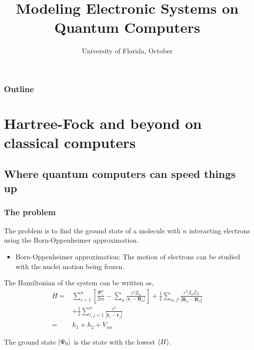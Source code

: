 \documentclass{beamer}
\title{Modeling Electronic Systems on Quantum Computers}
\date{University of Florida, October}
\renewcommand{\(}{\left(}
\renewcommand{\)}{\right)}
\renewcommand{\[}{\left[}
\renewcommand{\]}{\right]}
\begin{document}
\frame{\titlepage} 

\begin{frame}
    \frametitle{Outline}

    \tableofcontents

\end{frame}

\section{Hartree-Fock and beyond on classical computers}
\subsection{Where quantum computers can speed things up}

\begin{frame}
    \frametitle{The problem}

    The problem is to find the ground state of a molecule with $n$ interacting electrons using the Born-Oppenheimer approximation.
    \begin{itemize}
        \item Born-Oppenheimer approximation: The motion of electrons can be studied with the nuclei motion being frozen.
    \end{itemize}
    \pause
    The Hamiltonian of the system can be written as,
    \begin{align*}
        H = &\sum_{i=1}^n \[\frac{\bm P^2_i}{2m} - \sum_\alpha \frac{e^2 Z_\alpha}{|\bm r_i - \bm R_\alpha|} \] + \frac{1}{2} \sum_{\alpha, \beta} \frac{e^2 Z_\alpha Z_\beta}{|\bm R_\alpha - \bm R_\beta|} \\ 
        &+ \frac{1}{2} \sum_{i,j = 1}^n \frac{e^2}{|\bm r_i - \bm r_j|} \\ 
        =& h_1 + h_2 + V_{nn}
    \end{align*}\pause
    \begin{framed}
        The ground state $\ket{\Psi_0}$ is the state with the lowest $\braket{H}$.
    \end{framed}
\end{frame}
\end{document}
